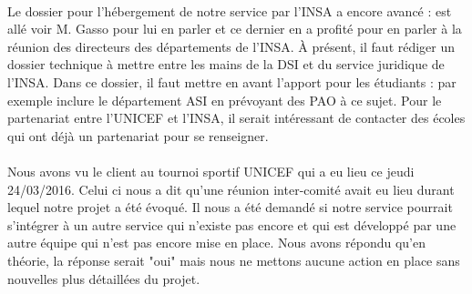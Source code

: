\documentclass [a4paper] {article}
\begin{document}
\paragraph*{}
Le dossier pour l’hébergement de notre service par l'INSA a encore avancé : \Sergi{} est allé voir M. Gasso pour lui en parler et ce dernier en a profité pour en parler à la réunion des directeurs des départements de l'INSA. À présent, il faut rédiger un dossier technique à mettre entre les mains de la DSI et du service juridique de l'INSA. Dans ce dossier, il faut mettre en avant l'apport pour les étudiants : par exemple inclure le département ASI en prévoyant des PAO à ce sujet. Pour le partenariat entre l'UNICEF et l'INSA, il serait intéressant de contacter des écoles qui ont déjà un partenariat pour se renseigner.

\paragraph*{}
Nous avons vu le client au tournoi sportif UNICEF qui a eu lieu ce jeudi 24/03/2016. Celui ci nous a dit qu'une réunion inter-comité avait eu lieu durant lequel notre projet a été évoqué. Il nous a été demandé si notre service pourrait s'intégrer à un autre service qui n'existe pas encore et qui est développé par une autre équipe qui n'est pas encore mise en place. Nous avons répondu qu'en théorie, la réponse serait "oui" mais nous ne mettons aucune action en place sans nouvelles plus détaillées du projet.





\newpage
\end{document}
